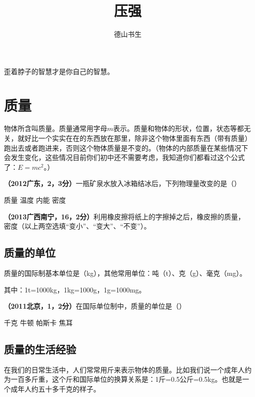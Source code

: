 \documentclass[12pt,twoside]{exam}
\begin{document}
\begin{coverpages}
\title{压强}
\author{德山书生}
\maketitle
\tableofcontents
\end{coverpages}
\begin{knowledge}
\begin{flushright}
\begin{notecard}{16em}
\ttfamily
歪着脖子的智慧才是你自己的智慧。
\end{notecard}
\end{flushright}
\section{质量}
物体所含叫质量。质量通常用字母$m$表示。质量和物体的形状，位置，状态等都无关，就好比一个实实在在的东西放在那里，除非这个物体里面有东西（带有质量）跑出去或者跑进来，否则这个物体质量是不变的。（物体的内部质量在某些情况下会发生变化，这些情况目前你们初中还不需要考虑，我知道你们都看过这个公式了：$E=mc^2$。）


\textbf{（2012广东，2，3分）}一瓶矿泉水放入冰箱结冰后，下列物理量改变的是（\answerline*[A]）

\begin{oneparchoices}
\choice 质量
\choice 温度
\choice 内能
\choice 密度
\end{oneparchoices}


\textbf{（2013广西南宁，16，2分）}利用橡皮擦将纸上的字擦掉之后，橡皮擦的质量\answerline*[变小]，密度\answerline*[不变]（以上两空选填“变小”、“变大”、“不变”）。


\subsection{质量的单位}
质量的国际制基本单位是\answerline*[千克]（kg），其他常用单位：吨（t）、克（g）、毫克（mg）。

其中：1t=1000kg，1kg=1000g，1g=1000mg。


\textbf{（2011北京，1，2分）}在国际单位制中，质量的单位是（\answerline*[A]）

\begin{oneparchoices}
\choice 千克
\choice 牛顿
\choice 帕斯卡
\choice 焦耳
\end{oneparchoices}

\subsection{质量的生活经验}
在我们的日常生活中，人们常常用斤来表示物体的质量。比如我们说一个成年人约为一百多斤重，这个斤和国际单位的换算关系是：1斤=0.5公斤=0.5kg。也就是一个成年人约五十多千克的样子。


\end{knowledge}
\end{document}
